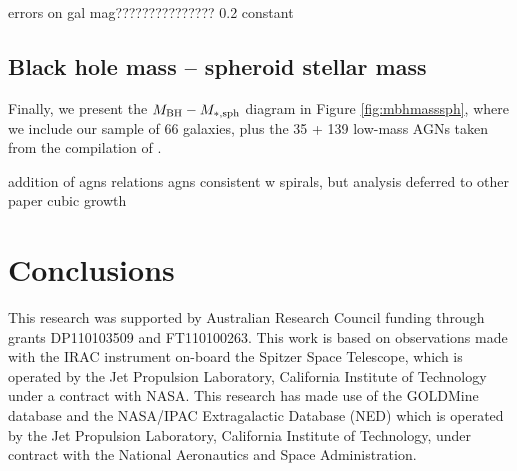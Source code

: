 \documentclass[preprint2]{emulateapj}
\begin{document}
errors on gal mag??????????????? 0.2 constant 

\subsection{Black hole mass -- spheroid stellar mass}
Finally, we present the $M_{\rm BH} - M_{\rm *,sph}$ diagram in Figure \ref{fig:mbhmasssph}, 
where we include our sample of 66 galaxies, 
plus the 35 + 139 low-mass AGNs taken from the compilation of \cite{grahamscott2015}. 

addition of agns
relations
agns consistent w spirals, but analysis deferred to other paper
cubic growth


\section{Conclusions}
\label{sec:concl}



\acknowledgments
This research was supported by Australian Research Council funding through grants
DP110103509 and FT110100263.
This work is based on observations made with the IRAC instrument \citep{fazio2004IRAC} 
on-board the Spitzer Space Telescope, 
which is operated by the Jet Propulsion Laboratory, 
California Institute of Technology under a contract with NASA.
This research has made use of the GOLDMine database \citep{goldmine} and the NASA/IPAC Extragalactic Database (NED) 
which is operated by the Jet Propulsion Laboratory, California Institute of Technology, 
under contract with the National Aeronautics and Space Administration. 





\clearpage
\end{document}
